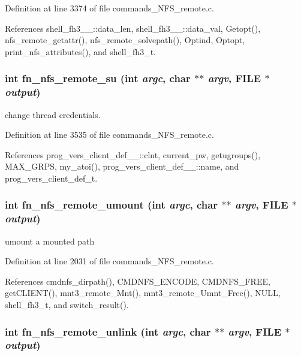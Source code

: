 Definition at line 3374 of file commands\_\-NFS\_\-remote.c.

References shell\_\-fh3\_\-\_\-::data\_\-len, shell\_\-fh3\_\-\_\-::data\_\-val, Getopt(), nfs\_\-remote\_\-getattr(), nfs\_\-remote\_\-solvepath(), Optind, Optopt, print\_\-nfs\_\-attributes(), and shell\_\-fh3\_\-t.
\subsubsection{\setlength{\rightskip}{0pt plus 5cm}int fn\_\-nfs\_\-remote\_\-su (int {\em argc}, char $\ast$$\ast$ {\em argv}, FILE $\ast$ {\em output})}\label{commands_8h_a99}


change thread credentials. 

Definition at line 3535 of file commands\_\-NFS\_\-remote.c.

References prog\_\-vers\_\-client\_\-def\_\-\_\-::clnt, current\_\-pw, getugroups(), MAX\_\-GRPS, my\_\-atoi(), prog\_\-vers\_\-client\_\-def\_\-\_\-::name, and prog\_\-vers\_\-client\_\-def\_\-t.
\subsubsection{\setlength{\rightskip}{0pt plus 5cm}int fn\_\-nfs\_\-remote\_\-umount (int {\em argc}, char $\ast$$\ast$ {\em argv}, FILE $\ast$ {\em output})}\label{commands_8h_a89}


umount a mounted path 

Definition at line 2031 of file commands\_\-NFS\_\-remote.c.

References cmdnfs\_\-dirpath(), CMDNFS\_\-ENCODE, CMDNFS\_\-FREE, get\-CLIENT(), mnt3\_\-remote\_\-Mnt(), mnt3\_\-remote\_\-Umnt\_\-Free(), NULL, shell\_\-fh3\_\-t, and switch\_\-result().
\subsubsection{\setlength{\rightskip}{0pt plus 5cm}int fn\_\-nfs\_\-remote\_\-unlink (int {\em argc}, char $\ast$$\ast$ {\em argv}, FILE $\ast$ {\em output})}\label{commands_8h_a93}


